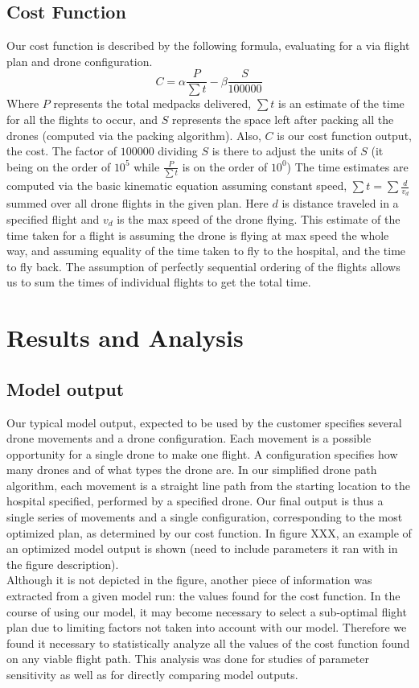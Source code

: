 \documentclass[twocolumn,10pt]{asme2ej}
\begin{document}
\subsection{Cost Function}
Our cost function is described by the following formula, evaluating for a via flight plan and drone configuration.
\[
C = \alpha \frac{P}{\sum{t}} - \beta \frac{S}{100000}
\]
Where $P$ represents the total medpacks delivered, $\sum{t}$ is an estimate of the time for all the flights to occur, and $S$ represents the space left after packing all the drones (computed via the packing algorithm). Also, $C$ is our cost function output, the cost. The factor of $100000$ dividing $S$ is there to adjust the units of $S$ (it being on the order of $10^5$ while $\frac{P}{\sum{t}}$ is on the order of $10^0$) The time estimates are computed via the basic kinematic equation assuming constant speed, $\sum{t}=\sum{\frac{d}{v_d}}$ summed over all drone flights in the given plan. Here $d$ is distance traveled in a specified flight and $v_d$ is the max speed of the drone flying. This estimate of the time taken for a flight is assuming the drone is flying at max speed the whole way, and assuming equality of the time taken to fly to the hospital, and the time to fly back. The assumption of perfectly sequential ordering of the flights allows us to sum the times of individual flights to get the total time.

\section{Results and Analysis}

\subsection{Model output}
Our typical model output, expected to be used by the customer specifies several drone movements and a drone configuration. Each movement is a possible opportunity for a single drone to make one flight. A configuration specifies how many drones and of what types the drone are. In our simplified drone path algorithm, each movement is a straight line path from the starting location to the hospital specified, performed by a specified drone. Our final output is thus a single series of movements and a single configuration, corresponding to the most optimized plan, as determined by our cost function. In figure XXX, an example of an optimized model output is shown (need to include parameters it ran with in the figure description). \\
Although it is not depicted in the figure, another piece of information was extracted from a given model run: the values found for the cost function. In the course of using our model, it may become necessary to select a sub-optimal flight plan due to limiting factors not taken into account with our model. Therefore we found it necessary to statistically analyze all the values of the cost function found on any viable flight path. This analysis was done for studies of parameter sensitivity as well as for directly comparing model outputs.
\end{document}
